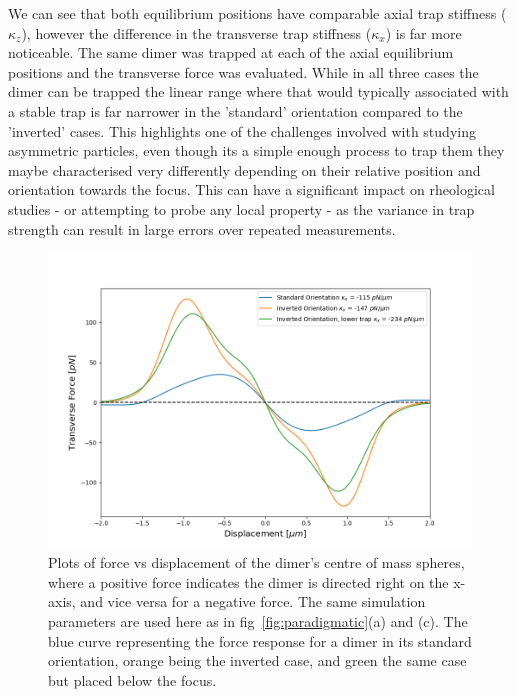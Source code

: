 We can see that both equilibrium positions have comparable axial trap 
stiffness ($\kappa_z$), however the difference in the transverse trap 
stiffness ($\kappa_x$) is far more noticeable. The same dimer was trapped
at each of the axial equilibrium positions and the transverse force was 
evaluated. While in all three cases the dimer can be trapped the linear
range where that would typically associated with a stable trap is far 
narrower in the 'standard' orientation compared to the 'inverted' cases. 
This highlights one of the challenges involved with studying 
asymmetric particles, even though its a simple enough process to trap them 
they maybe characterised very differently depending on their relative position 
and orientation towards the focus. This can have a significant impact on 
rheological studies - or attempting to probe any local property - as the 
variance in trap strength can result in large errors over repeated measurements. 
\begin{figure}[h!]
	\centering
	\includegraphics[width=\linewidth]{transverse_force.png}
	\caption{Plots of force vs displacement of the dimer's centre of mass spheres, 
		where a positive force indicates the dimer is directed right on the x-axis, 
		and vice versa for a negative force. The same simulation parameters are used here as in fig~\ref{fig:paradigmatic}(a) and (c). The blue curve representing the force response for a dimer in its standard orientation, orange being the inverted case, and green the same case but placed below the focus.}
	\label{fig:transverse_force}
\end{figure}

